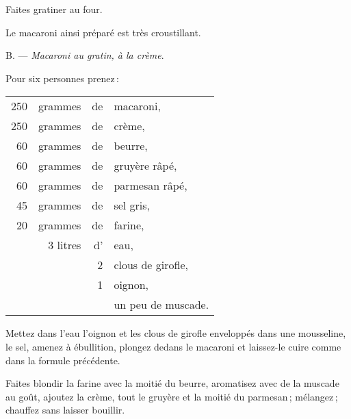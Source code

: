 Faites gratiner au four.

Le macaroni ainsi préparé est très croustillant.

\medskip

B. — \textit{Macaroni au gratin, à la crème}.

\medskip

Pour six personnes prenez :

\footnotesize
\begin{longtable}{rrrp{16em}}
    250 & grammes  & de & macaroni,                                                                       \\
    250 & grammes  & de & crème,                                                                          \\
     60 & grammes  & de & beurre,                                                                         \\
     60 & grammes  & de & gruyère râpé,                                                                   \\
     60 & grammes  & de & parmesan râpé,                                                                  \\
     45 & grammes  & de & sel gris,                                                                       \\
     20 & grammes  & de & farine,                                                                         \\
        & 3 litres & d' & eau,                                                                            \\
        &          &  2 & clous  de girofle,                                                              \\
        &          &  1 & oignon,                                                                         \\
        &          &    & un peu de muscade.                                                              \\
\end{longtable}
\normalsize

Mettez dans l'eau l'oignon et les clous de girofle enveloppés dans une
mousseline, le sel, amenez à ébullition, plongez dedans le macaroni et
laissez-le cuire comme dans la formule précédente.

Faites blondir la farine avec la moitié du beurre, aromatisez avec de la muscade
au goût, ajoutez la crème, tout le gruyère et la moitié du parmesan ; mélangez ;
chauffez sans laisser bouillir.

